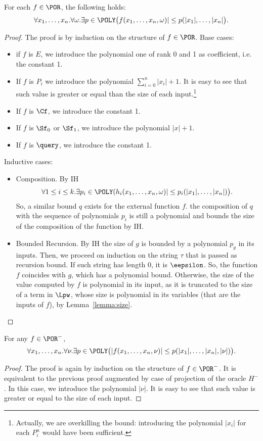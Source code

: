 \begin{lemma}\label{SFPlemma9}
{For each $f\in \POR$, the following holds:
$$
\forall x_1,\dots,x_n.\forall \omega.\exists p\in \POLY
\big(f(x_1,\dots, x_n,\omega)| \leq p(|x_1|,\dots, |x_n|\big).
$$}
\end{lemma}
\begin{proof}
{The proof is by induction on the structure of $f\in \POR$. Base cases}:
\begin{itemize}
\item if $f$ is $E$, we introduce the polynomial
one of rank {0} and {1}
as coefficient, i.e. the constant {1}.
%
\item If $f$ is $P_i$ we introduce the polynomial
$\sum^n_{i=0}|x_i|+1$.
It is easy to see that such value is greater or
equal than the size of each input.\footnote{Actually,
we are overkilling the bound: introducing the polynomial
$|x_i|$ for each
$P^n_i$ would have been sufficient.}
%
\item If $f$ is $\Cf$, we introduce the
constant {1}.
%
\item If $f$ is $\Sf_0$ or $\Sf_1$, we introduce the
polynomial {$|x|+1$}.
%
\item If $f$ is $\query$, we introduce the constant
{1}.
\end{itemize}
Inductive cases:
\begin{itemize}
\item Composition. By IH
$$
\forall 1\leq i\leq k.\exists p_i\in \POLY(h_i(x_1,\dots, x_n,\omega)|
\leq p_i(|x_1|,\dots, |x_n|)\big).
$$
So, a similar bound $q$ exists for the external
function $f$. the composition of $q$
with the sequence of polynomials $p_i$ is
still a polynomial and bounds the size of the composition
of the function by IH.
%
\item Bounded Recursion.
By IH the size of $g$ is bounded by a polynomial
$p_g$ in its inputs.
{Then, we proceed on induction
on the string $\tau$ that is passed as recursion bound.}
If such string has length {0}, it is
{$\eepsilon$}.
So, the function $f$ coincides with $g$,
which has a polynomial bound.
Otherwise, the size of the value computed
by $f$ is polynomial in its input, as
it is truncated to the size of a term in $\Lpw$,
whose size is polynomial in its variables
(that are the inputs of $f$), by Lemma~\ref{lemma:size}.
\end{itemize}
\end{proof}




\begin{lemma}
For any $f\in \POR^-$,
$$
\forall x_1,\dots, x_n.\forall \nu.\exists p\in \POLY
\big(|f(x_1,\dots, x_n,\nu)| \leq p(|x_1|,\dots, |x_n|, |\nu|)\big).
$$
\end{lemma}
\begin{proof}
The proof is again by induction on the structure
of $f\in \POR^-$.
It is equivalent to the previous proof augmented
by case of projection of the oracle
$H^-$. In this case, we introduce
the polynomial $|\nu|$.
It is easy to see that such value is greater or equal to the
size of each input.
\end{proof}




